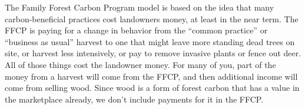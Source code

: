 \documentclass{article}\usepackage[]{graphicx}\usepackage[]{color}
\begin{document}
The Family Forest Carbon Program model is based on the idea that many carbon-beneficial practices cost landowners money, at least in the near term. The FFCP is paying for a change in behavior from the ``common practice'' or ``business as usual'' harvest to one that might leave more standing dead trees on site, or harvest less intensively, or pay to remove invasive plants or fence out deer. All of those things cost the landowner money. For many of you, part of the money from a harvest will come from the FFCP, and then additional income will come from selling wood. Since wood is a form of forest carbon that has a value in the marketplace already, we don’t include payments for it in the FFCP.
\end{document}
